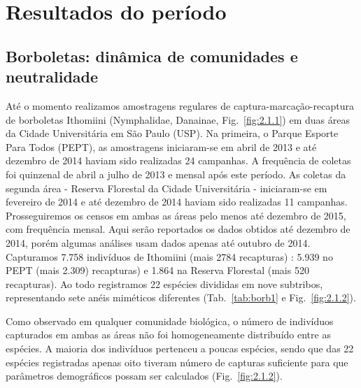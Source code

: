 \documentclass[12pt, A4]{article}
\begin{document}
\section{Resultados do período}

\subsection{Borboletas: dinâmica de comunidades e neutralidade} %
\label{sec:dinamica-temporal-borb} 

Até o momento realizamos amostragens regulares de
captura-marcação-recaptura de borboletas Ithomiini (Nymphalidae,
Danainae, Fig.~\ref{fig:2.1.1}) 
em duas áreas da Cidade Universitária em São Paulo (USP). Na
primeira, o Parque Esporte Para Todos (PEPT), as amostragens
iniciaram-se em abril de 2013 e até dezembro de 2014 haviam sido
realizadas 24 campanhas. A frequência de coletas foi
quinzenal de abril a julho de 2013 e mensal após este
período. As coletas da segunda área - Reserva
Florestal da Cidade Universitária - iniciaram-se em fevereiro de 2014
e até dezembro de 2014 haviam sido realizadas 11 campanhas. Prosseguiremos
os censos em ambas as áreas pelo menos até dezembro de 2015,
com frequência mensal. Aqui serão reportados os dados obtidos até
dezembro de 2014, porém algumas análises usam dados apenas até outubro de 2014.
Capturamos 7.758 indivíduos de Ithomiini (mais 2784 recapturas) : 
5.939 no PEPT (mais 2.309) recapturas) e 1.864 na Reserva Florestal (mais 520 recapturas). 
Ao todo registramos 22 espécies divididas em nove subtribos, 
representando sete anéis miméticos diferentes (Tab.~\ref{tab:borb1} e Fig.~\ref{fig:2.1.2}).

Como observado em qualquer comunidade biológica, o número de
indivíduos capturados em ambas as áreas não foi homogeneamente
distribuído entre as espécies. A maioria dos indivíduos pertenceu a
poucas espécies, sendo que das 22 espécies registradas apenas oito
tiveram número de capturas
suficiente para que parâmetros demográficos possam ser calculados
(Fig.~\ref{fig:2.1.2}). 
\end{document}
